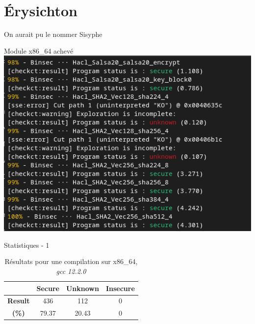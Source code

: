 \documentclass[A4,svgnames,9pt,aspectratio=169]{beamer}
\begin{document}

\section{Érysichton}
\frame{\sectionpage}

\begin{frame}{On aurait pu le nommer Sisyphe}
  
  \begin{block}{Module x86\_64 achevé}
    \centering
    \includegraphics[scale = 0.4, trim= 6pt 0pt 0pt 0pt, clip]{imgs/Capture d’écran du 2025-07-23 11-01-55.png}
  \end{block}

\end{frame}


\begin{frame}{Statistiques - 1}
  \begin{table}[h]
    \centering
    \begin{tabular}{|c|c|c|c|}
      \hline
      & \textbf{Secure} & \textbf{Unknown} & \textbf{Insecure} \\
      \hline
      \textbf{Result} & 436 & 112 & 0 \\
      \hline
      \textbf{(\%)} & 79.37 & 20.43 & 0 \\
      \hline
    \end{tabular}
    \caption{Résultats pour une compilation sur x86\_64, \textit{gcc 12.2.0}}
    \label{tab:simple}
  \end{table}
\end{frame}
\end{document}
